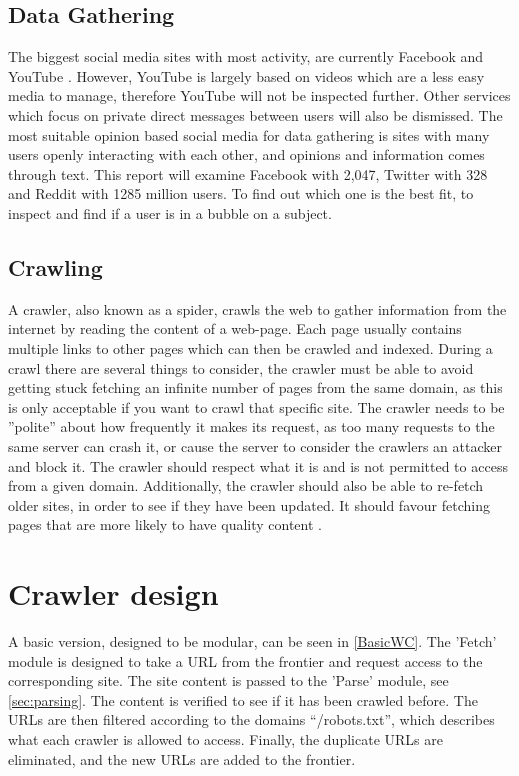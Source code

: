 \subsection{Data Gathering}
The biggest social media sites with most activity, are currently Facebook and
YouTube \citep{SocialMediaStats}.
However, YouTube is largely based on videos which are a less easy media to
manage, therefore YouTube will not be inspected further. Other services which
focus on private direct messages between users will also be dismissed. The most
suitable opinion based social media for data gathering is sites with many users
openly interacting with each other, and opinions and information comes through
text. This report will examine Facebook with 2,047, Twitter with 328 and
Reddit with 1285 million users. To find out which one is the best fit, to inspect and
find if a user is in a bubble on a subject.

\subsection{Crawling}
A crawler, also known as a spider, crawls the web to gather information from the
internet by reading the content of a web-page. Each page usually contains
multiple links to other pages which can then be crawled and indexed. During a
crawl there are several things to consider, the crawler must be able to avoid
getting stuck fetching an infinite number of pages from the same domain, as this
is only acceptable if you want to crawl that specific site. The crawler needs to
be ''polite'' about how frequently it makes its request, as too many requests to
the same server can crash it, or cause the server to consider the crawlers an
attacker and block it. The crawler should respect what it is and is not
permitted to access from a given domain. Additionally, the crawler should also
be able to re-fetch older sites, in order to see if they have been updated. It
should favour fetching pages that are more likely to have quality content
\citep[Ch. 20.1]{manning2008introduction}.\nl

\section{Crawler design}%
A basic version, designed to be modular, can be seen in \autoref{BasicWC}. The
'Fetch' module is designed to take a URL from the frontier and request access to
the corresponding site. The site content is passed to the 'Parse' module, see
\autoref{sec:parsing}.
The content is verified to see if it has been crawled before. The URLs are then
filtered according to the domains ``/robots.txt'', which describes what each
crawler is allowed to access. Finally, the duplicate URLs are eliminated, and
the new URLs are added to the frontier.

